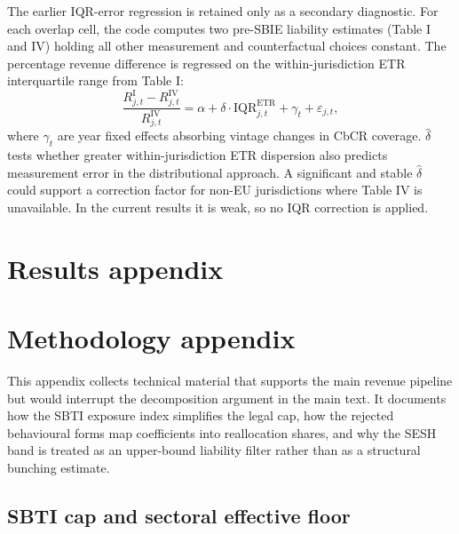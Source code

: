 \documentclass[11pt,a4paper]{article}
\begin{document}
The earlier IQR-error regression is retained only as a secondary diagnostic. For each overlap cell, the code computes two pre-SBIE liability estimates (Table I and IV) holding all other measurement and counterfactual choices constant. The percentage revenue difference is regressed on the within-jurisdiction ETR interquartile range from Table I:
\begin{equation}\label{eq:crossval_regression}
\frac{R_{j,t}^{\text{I}} - R_{j,t}^{\text{IV}}}{R_{j,t}^{\text{IV}}} = \alpha + \delta \cdot \text{IQR}_{j,t}^{\text{ETR}} + \gamma_t + \varepsilon_{j,t},
\end{equation}
where $\gamma_t$ are year fixed effects absorbing vintage changes in CbCR coverage. $\hat{\delta}$ tests whether greater within-jurisdiction ETR dispersion also predicts measurement error in the distributional approach. A significant and stable $\hat{\delta}$ could support a correction factor for non-EU jurisdictions where Table IV is unavailable. In the current results it is weak, so no IQR correction is applied.

\section{Results appendix}\label{app:results}



\section{Methodology appendix}\label{app:method}

This appendix collects technical material that supports the main revenue pipeline but would interrupt the decomposition argument in the main text. It documents how the SBTI exposure index simplifies the legal cap, how the rejected behavioural forms map coefficients into reallocation shares, and why the SESH band is treated as an upper-bound liability filter rather than as a structural bunching estimate.

\subsection{SBTI cap and sectoral effective floor}\label{app:sbti_details}
\end{document}
